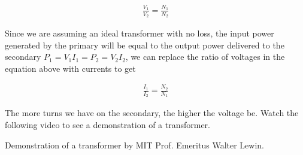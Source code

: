 \documentclass{ximera}
\begin{document}
\begin{eqnarray}
\frac{V_1}{V_2}=\frac{N_1}{N_2} 
\end{eqnarray}


Since we are assuming an ideal transformer with no loss, the input power generated by the primary will be equal to the output power delivered to the secondary $P_1=V_1 I_1= P_2 = V_2 I_2$, we can replace the ratio of voltages in the equation above with currents to get


\begin{eqnarray}
\frac{I_1}{I_2}=\frac{N_2}{N_1} 
\end{eqnarray}





The more turns we have on the secondary, the higher the voltage be. Watch the following video to see a demonstration of a transformer.

\begin{example}


Demonstration of a transformer by MIT Prof. Emeritus Walter Lewin.
\begin{center}  
\end{center} 

\end{example}
\end{document}
